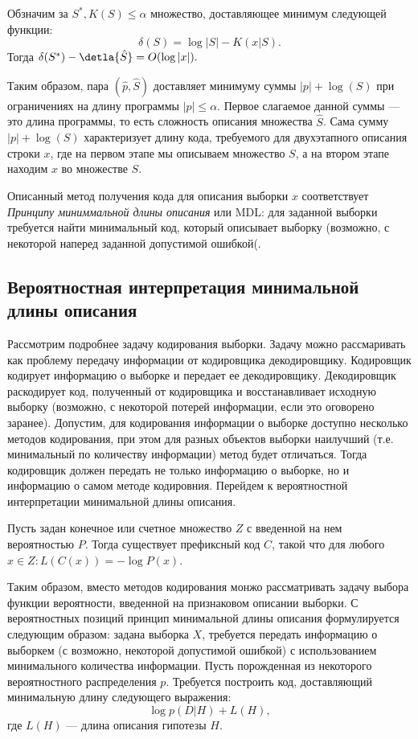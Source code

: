 \documentclass[../main.tex]{subfiles}
\begin{document}
\begin{theorembd}
Обзначим за $S^{*}, K(S) \leq \alpha$  множество, доставляющее минимум следующей функции:
\[
    \delta(S) = \log |S| - K(x|S).
\]
Тогда  $\delta(S^{*}) - \detla{\hat{S}} = O(\log |x|).$
\end{theorembd}

Таким образом, пара $(\hat{p}, \hat{S})$ доставляет минимуму суммы $|p| + \log(S)$ при ограничениях на длину программы $|p| \leq \alpha$. Первое слагаемое данной суммы --- это длина  программы, то есть сложность описания множества $\hat{S}$. Сама сумму $|p| + \log(S)$ характеризует длину кода, требуемого для двухэтапного описания строки $x$, где на первом этапе мы описываем множество $S$, а на втором этапе находим $x$ во множестве $S$.

Описанный метод получения кода для описания выборки $x$ соответствует \textit{Принципу миниммальной длины описания} или MDL: для заданной выборки требуется найти минимальный код, который описывает выборку (возможно, с некоторой наперед заданной допустимой ошибкой(.

\subsection{Вероятностная интерпретация минимальной длины описания}
Рассмотрим подробнее задачу кодирования выборки. Задачу можно рассмаривать как проблему передачу информации от кодировщика декодировщику. Кодировщик кодирует информацию о выборке и передает ее декодировщику. Декодировщик раскодирует код, полученный от кодировщика и восстанавливает исходную выборку (возможно, с некоторой потерей информации, если это оговорено заранее).
Допустим, для кодирования информации о выборке доступно несколько методов кодирования, при этом для разных объектов выборки наилучший (т.е. минимальный по количеству информации) метод будет отличаться. Тогда кодировщик должен передать не только информацию о выборке, но и информацию о самом методе кодировния. Перейдем к вероятностной интерпретации минимальной длины описания.

\begin{theorembd}
Пусть задан конечное или счетное множество $Z$ с введенной на нем вероятностью $P$. Тогда существует префиксный код $C$, такой что для любого $x \in Z : L(C(x)) = -\log P(x)$.
\end{theorembd}

Таким образом, вместо методов кодирования монжо рассматривать задачу выбора функции вероятности, введенной на признаковом описании выборки. 
С вероятностных позиций принцип минимальной длины описания формулируется следующим образом: задана выборка $X$, требуется передать информацию о выборкем (с возможно, некоторой допустимой ошибкой) с использованием минимального количества информации. Пусть
 порожденная из некоторого вероятностного распределения $p$. Требуется построить код, доставляющий минимальную длину следующего выражения:
\[
    \log p(D|H) + L(H), 
\]
где $L(H)$ --- длина описания гипотезы $H$. 
\end{document}
